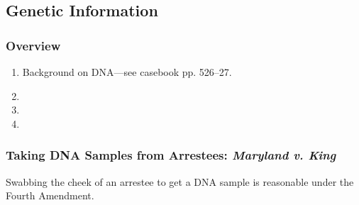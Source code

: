 \subsection{Genetic Information}

\subsubsection{Overview}

\begin{enumerate}
    \item Background on DNA---see casebook pp. 526--27.
    \item %
    \item %
    \item %
\end{enumerate}

\subsubsection{Taking DNA Samples from Arrestees: \emph{Maryland v. King}}

Swabbing the cheek of an arrestee to get a DNA sample is reasonable under the 
Fourth Amendment.

